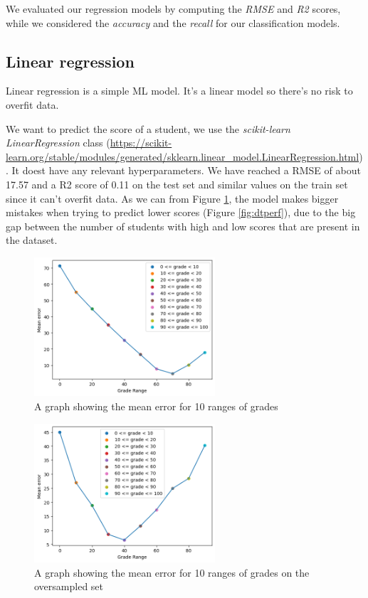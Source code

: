 \documentclass{article}
\begin{document}
We evaluated our regression models by computing the \textit{RMSE} and \textit{R2} scores, while we considered the \textit{accuracy} and the \textit{recall} for our classification models.

\subsection{Linear regression}
\FloatBarrier
Linear regression is a simple ML model. It's a linear model so there's no risk to overfit data.

We want to predict the score of a student, we use the \textit{scikit-learn LinearRegression} class (\url{https://scikit-learn.org/stable/modules/generated/sklearn.linear_model.LinearRegression.html}). It doest have any relevant hyperparameters.
We have reached a RMSE of about 17.57 and a R2 score of 0.11 on the test set and similar values on the train set since it can't overfit data.
As we can from Figure \ref{fig:errorGraph}, the model makes bigger mistakes when trying to predict lower scores (Figure \ref{fig:dtperf}), due to the big gap between the number of students with high and low scores that are present in the dataset. 

\begin{figure}[h!]
    \centering
    \includegraphics[width=0.6\textwidth]{grades_errors.png}
    \caption{A graph showing the mean error for 10 ranges of grades}
    \label{fig:errorGraph}
\end{figure}

\begin{figure}[h!]
    \centering
    \includegraphics[width=0.6\textwidth]{grades_errors2.png}
    \caption{A graph showing the mean error for 10 ranges of grades on the oversampled set}
    \label{fig:errorGraph2}
\end{figure}
\newpage
\end{document}
